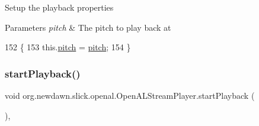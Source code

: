 Setup the playback properties


\begin{DoxyParams}{Parameters}
{\em pitch} & The pitch to play back at \\
\hline
\end{DoxyParams}

\begin{DoxyCode}
152                                    \{
153         this.\mbox{\hyperlink{classorg_1_1newdawn_1_1slick_1_1openal_1_1_open_a_l_stream_player_a3841668c39ff3eccf93978ee5ca7bc3e}{pitch}} = \mbox{\hyperlink{classorg_1_1newdawn_1_1slick_1_1openal_1_1_open_a_l_stream_player_a3841668c39ff3eccf93978ee5ca7bc3e}{pitch}};
154     \}
\end{DoxyCode}
\mbox{\label{classorg_1_1newdawn_1_1slick_1_1openal_1_1_open_a_l_stream_player_a42538934813aebc2b0b210953afc74d6}} 
\subsubsection{\texorpdfstring{start\+Playback()}{startPlayback()}}
{\footnotesize\ttfamily void org.\+newdawn.\+slick.\+openal.\+Open\+A\+L\+Stream\+Player.\+start\+Playback (\begin{DoxyParamCaption}{ }\end{DoxyParamCaption})\hspace{0.3cm}{\ttfamily [inline]}, {\ttfamily [private]}}

